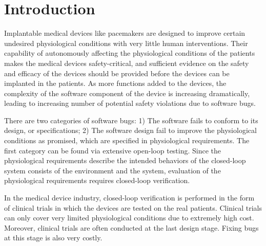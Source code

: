 \section{Introduction}
\label{introduction}

Implantable medical devices like pacemakers are designed to improve certain undesired physiological conditions with very little human interventions. Their capability of autonomously affecting the physiological conditions of the patients makes the medical devices safety-critical, and sufficient evidence on the safety and efficacy of the devices should be provided before the devices can be implanted in the patients. As more functions added to the devices, the complexity of the software component of the device is increasing dramatically, leading to increasing number of potential safety violations due to software bugs. 

There are two categories of software bugs: 1) The software fails to conform to its design, or specifications; 2) The software design fail to improve the physiological conditions as promised, which are specified in physiological requirements. The first category can be found via extensive open-loop testing. Since the physiological requirements describe the intended behaviors of the closed-loop system consists of the environment and the system, evaluation of the physiological requirements requires closed-loop verification. 

In the medical device industry, closed-loop verification is performed in the form of clinical trials in which the devices are tested on the real patients. Clinical trials can only cover very limited physiological conditions due to extremely high cost. Moreover, clinical trials are often conducted at the last design stage. Fixing bugs at this stage is also very costly.
